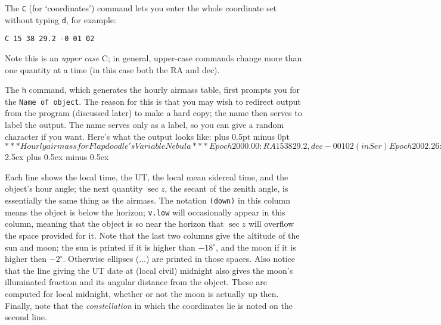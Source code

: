 The {\tt C} (for `coordinates') command lets you enter the
whole coordinate set without typing {\tt d}, for example: 
\par
{\tt \qquad C 15 38 29.2 -0 01 02}
\par
Note this is an {\it upper case} C; in general, upper-case commands
change more than one quantity at a time (in this case both the
RA and dec).


The {\tt h} command, which generates the hourly airmass table, first 
prompts you for the {\tt Name of object}.  The reason for this is 
that you may wish to redirect output from the program (discussed 
later) to make a hard copy; the name then serves to label the output.
The name serves only as a label, so you can give a random character
if you want.  Here's what the output looks like:
\parskip 0pt plus 0.5pt minus 0pt
\verbatim$

*** Hourly airmass for Flapdoodle's Variable Nebula ***

Epoch 2000.00: RA  15 38 29.2, dec  -0 01 02  (in Ser)
Epoch 2002.26: RA  15 38 36.1, dec  -0 01 28

At midnight: UT date 2002 Apr 5, Moon 0.43 illum,  64 degr from obj

  Local      UT      LMST      HA     secz   par.angl. SunAlt MoonAlt

  19 00     2 00     7 26    -8 12   (down)   -53.4     -3.3    ...
  20 00     3 00     8 27    -7 12   (down)   -56.7    -15.7    ...
  21 00     4 00     9 27    -6 12   (down)   -58.0     ...     ...
  22 00     5 00    10 27    -5 12    5.644   -57.5     ...     ...
  23 00     6 00    11 27    -4 12    2.588   -55.0     ...     ...
   0 00     7 00    12 27    -3 11    1.757   -49.9     ...     ...
   1 00     8 00    13 27    -2 11    1.403   -41.0     ...     ...
   2 00     9 00    14 28    -1 11    1.238   -26.1     ...     ...
   3 00    10 00    15 28    -0 11    1.180    -4.4     ...      5.7
   4 00    11 00    16 28     0 49    1.207    18.9     ...     15.4
   5 00    12 00    17 28     1 49    1.327    36.4    -15.3    23.6
   6 00    13 00    18 28     2 50    1.597    47.2     -2.9    29.8

$
\medskip
\parskip 2.5ex plus 0.5ex minus 0.5ex

Each line shows the local time, the UT, the local mean sidereal time, 
and the object's hour angle; the next
quantity $\sec z$, the secant of the zenith angle, is essentially
the same thing as the airmass.   The notation {\tt (down)} in
this column means the object is below the horizon; {\tt v.low}
will occasionally appear in this column, meaning that the
object is so near the horizon that $\sec z$ will overflow the
space provided for it.   Note that the last two columns
give the altitude of the sun and moon; the sun is printed if 
it is higher than $-18^{\circ}$, and the moon if it is higher
then $-2^{\circ}$.  Otherwise ellipses (${\ldots}$) are 
printed in those spaces.  Also notice that the line giving
the UT date at (local civil) 
midnight also gives the moon's illuminated fraction and its angular
distance from the object.  These are computed for local midnight, whether
or not the moon is actually up then.   Finally, note that the
{\it constellation} in which the coordinates lie is noted on the
second line.

